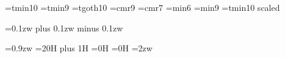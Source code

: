 %

\font\tentmin=tmin10
\font\ninetmin=tmin9
\font\tentgoth=tgoth10
\font\ninerm=cmr9
\font\sevenrm=cmr7
\font\sixmin=min6
\font\ninemin=min9
\font\minii=tmin10 scaled 

\ninetmin \ninerm

\newskip{}
=0.1zw plus 0.1zw minus 0.1zw

\def\pTeX{p\kern-.2em\TeX}

\def\連数字#1{\hskip\連数skip\hbox to 0pt{\yoko\hss#1\hss}\nobreak\hskip\連数skip}
\def\連三字#1{{\sevenrm\hskip\連数skip\hbox to 0pt{\yoko\hss#1\hss}\nobreak\hskip\連数skip}}

\def\nidan{
  \loop\ifvbox0
    \vfill
    \vbox to \vsize{\baselineskip0mm \lineskiplimit0mm
      \vss
      \hbox to \hsize{\hss%
    \vbox{\tate
      \hrule
      \hbox to 210mm{%
        \vrule\hskip 70H%
        \setbox1=\vsplit0 to 452H
        \vtop to 148mm{\vskip 70H\unvbox1\vskip 70H}%
        \hskip 36H%
        \setbox1=\vsplit0 to 452H
        \vtop to 148mm{\vskip 70H\unvbox1\vskip 70H}%
        \hss%
	\ifodd\count0%
        \vtop{\vskip 70H\hbox to 452H{\yoko$\oldstyle\number\count0$\ 
		\sixmin 京都下宿案内\hfil}}%
	\else%
        \vtop{\vskip 70H\hbox to 452H{\yoko\hfil\sixmin 京都下宿案内\ 
		$\oldstyle\number\count0$}}%
	\fi%
        \hskip 56H\vrule%
      }
      \hrule
    }%
      \hss}\vskip3mm
    \hbox to \hsize{\hfill\rm\tengt
      Naochan!\ の『改訂版・京都下宿案内』より\hfill}
    \vss}
    \vfill
    \eject
  \repeat
}

\splittopskip=0pt
\splitmaxdepth=0pt
\tbaselineshift=2pt
\parindent=0.9zw
\baselineskip=20H plus 1H
\lineskiplimit=0H
\lineskip=0H
\leftskip=2zw

\def\半行空け{\vskip 10H plus 0.5H}

\def\一行空け{\vskip\baselineskip}

\def\科白#1{\parindent=0zw\par 「#1」\parindent=0.9zw}

\def\item#1{\leavevmode\hbox to 0pt{\kern-\leftskip #1\hss}}

